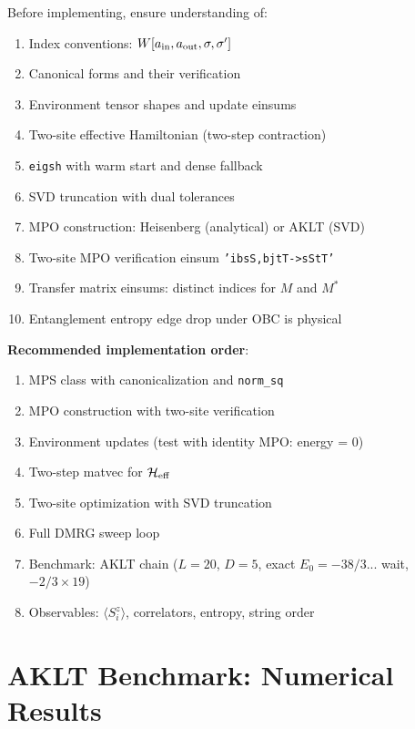 \documentclass[aps,prb,onecolumn,scriptaddress]{revtex4-2}
\begin{document}
	Before implementing, ensure understanding of:
	
	\begin{enumerate}
		\item[$\square$] Index conventions: $W[a_{\rm in}, a_{\rm out}, \sigma, \sigma']$
		\item[$\square$] Canonical forms and their verification
		\item[$\square$] Environment tensor shapes and update einsums
		\item[$\square$] Two-site effective Hamiltonian (two-step contraction)
		\item[$\square$] \texttt{eigsh} with warm start and dense fallback
		\item[$\square$] SVD truncation with dual tolerances
		\item[$\square$] MPO construction: Heisenberg (analytical) or AKLT (SVD)
		\item[$\square$] Two-site MPO verification einsum \texttt{'ibsS,bjtT->sStT'}
		\item[$\square$] Transfer matrix einsums: distinct indices for $M$ and $M^*$
		\item[$\square$] Entanglement entropy edge drop under OBC is physical
	\end{enumerate}
	
	\textbf{Recommended implementation order}:
	\begin{enumerate}
		\item MPS class with canonicalization and \texttt{norm\_sq}
		\item MPO construction with two-site verification
		\item Environment updates (test with identity MPO: energy = 0)
		\item Two-step matvec for $\mathcal{H}_{\rm eff}$
		\item Two-site optimization with SVD truncation
		\item Full DMRG sweep loop
		\item Benchmark: AKLT chain ($L=20$, $D=5$, exact $E_0 = -38/3$... wait, $-2/3\times19$)
		\item Observables: $\langle S^z_i\rangle$, correlators, entropy, string order
	\end{enumerate}

\clearpage
\section{AKLT Benchmark: Numerical Results}
\label{sec:aklt_numerical}
\end{document}
